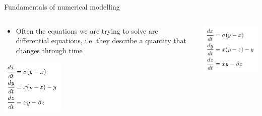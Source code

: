 \begin{frame}{\insertsectionnumber{ |} Fundamentals of numerical modelling}


\begin{columns}

\column[c]{6cm}

\begin{beamerboxesrounded}[lower=gray,shadow=true]{
\begin{itemize}
\item Often the equations we are trying to solve are differential equations, i.e. they describe a quantity that changes through time
\end{itemize}
\centering\includegraphics[width=3cm]{images/lorenz_eqs.png}\\
}
\end{beamerboxesrounded}

\column[c]{4.5cm}
\href{run:mplayer ./images/lorenz_2.gif}{
\includegraphics[scale=0.25]
{./images/lorenz_eqs.png}}
\end{columns}


\end{frame}



